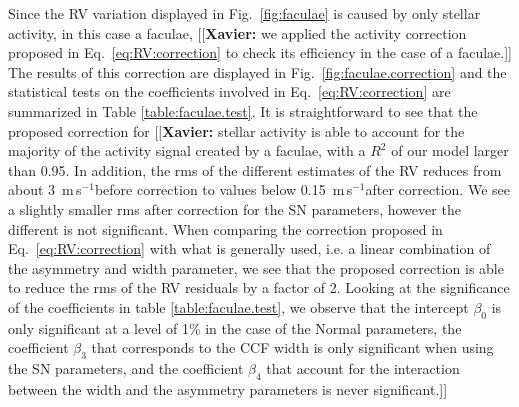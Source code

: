 \documentclass{aa}
\def\ms{\hbox{\,m\,s$^{-1}$}}         %
\newcommand{\xavier}[1]{{\color{blue}[[\textbf{Xavier: }#1]]}}
\begin{document}
Since the RV variation displayed in Fig.~\ref{fig:faculae} is caused by only stellar activity, in this case a faculae, \xavier{we applied the activity correction proposed in Eq.~\ref{eq:RV:correction} to check its efficiency in the case of a faculae.} The results of this correction are displayed in Fig.~\ref{fig:faculae.correction} and the statistical tests on the coefficients involved in Eq.~\ref{eq:RV:correction} are summarized in Table \ref{table:faculae.test}. 
It is straightforward to see that the proposed correction for \xavier{stellar activity is able to account for the majority of the activity signal created by a faculae, with a $R^2$ of our model larger than 0.95. In addition, the rms of the different estimates of the RV reduces from about 3 \ms before correction to values below 0.15 \ms after correction.
We see a slightly smaller rms after correction for the SN parameters, however the different is not significant. When comparing the correction proposed in Eq.~\ref{eq:RV:correction} with what is generally used, i.e. a linear combination of the asymmetry and width parameter, we see that the proposed correction is able to reduce the rms of the RV residuals by a factor of 2. Looking at the significance of the coefficients in table \ref{table:faculae.test}, we observe that the intercept $\beta_0$ is only significant at a level of 1\% in the case of the Normal parameters, the coefficient $\beta_3$ that corresponds to the CCF width is only significant when using the SN parameters, and the coefficient $\beta_4$ that account for the interaction between the width and the asymmetry parameters is never significant.}
\end{document}
